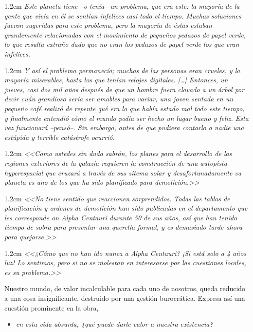 \documentclass[10pt]{article}
\newcommand{\citalitlar}[1]{
\begin{adjustwidth}{1.2cm}{}
\emph{#1}
\end{adjustwidth}
}
\begin{document}
         \citalitlar{Este planeta tiene --o tenía-- un problema, que era este:
           la mayoría de la gente que vivía en él se sentían infelices casi todo
           el tiempo. Muchas soluciones fueron sugeridas para este problema,
           pero la mayoría de éstas estaban grandemente relacionadas con el
           movimiento de pequeños pedazos de papel verde, lo que resulta extraño
           dado que no eran los pedazos de papel verde los que eran infelices.}
         \citalitlar{Y así el problema permanecía; muchas de las personas eran
           crueles, y la mayoría miserables, hasta los que tenían relojes
           digitales. [\ldots] Entonces, un jueves, casi dos mil años después de
           que un hombre fuera clavado a un árbol por decir cuán grandioso sería
           ser amables para variar, una joven sentada en un pequeño café realizó
           de repente qué era lo que había estado mal todo este tiempo, y
           finalmente entendió cómo el mundo podía ser hecho un lugar bueno y
           feliz. Esta vez funcionará --pensó--. Sin embargo, antes de que
           pudiera contarlo a nadie una estúpida y terrible catástrofe ocurrió.}
         \citalitlar{<<Como ustedes sin duda sabrán, los planes para el
           desarrollo de las regiones exteriores de la galaxia requieren la
           construcción de una autopista hyperespacial que cruzará a través de
           sus sitema solar y desafortunadamente su planeta es uno de los que ha
           sido planificado para demolición.>>} \citalitlar{<<No tiene sentido
           que reaccionen sorprendidos. Todas las tablas de planificación y
           ordenes de demolición han sido publicadas en el departamento que les
           corresponde an Alpha Centauri durante 50 de sus años, así que han
           tenido tiempo de sobra para presentar una querella formal, y es
           demasiado tarde ahora para quejarse.>>} \citalitlar{<<¿Cómo que no
           han ido nunca a Alpha Centauri? ¡Si está solo a 4 años luz! Lo
           sentimos, pero si no se molestan en interesarse por las cuestiones
           locales, es su problema.>>}

       Nuestro mundo, de valor incalculable para cada uno de nosotros, queda
       reducido a una cosa insignificante, destruido por una gestión
       burocrática. Expresa así una cuestión prominente en la obra,
         \begin{itemize}
         \item \emph{en esta vida absurda, ¿qué puede darle valor a nuestra
             existencia?}
         \end{itemize}
\end{document}
